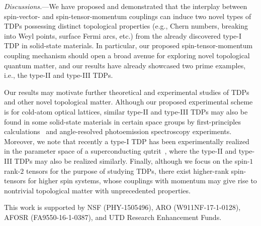 \documentclass[aps,prl,floatfix,twocolumn,reprint]{revtex4}
\begin{document}
{\color{blue}\textit{Discussions.}---}We have proposed and
demonstrated that the interplay between spin-vector- and
spin-tensor-momentum couplings can induce two novel types of TDPs possessing
distinct topological properties (e.g., Chern numbers, breaking into Weyl
points, surface Fermi arcs, etc.) from the already discovered type-I TDP in
solid-state materials. In particular, our proposed spin-tensor-momentum
coupling mechanism should open a broad avenue for exploring novel
topological quantum matter, and our results have already showcased two prime
examples, i.e., the type-II and type-III TDPs.

Our results may motivate further theoretical and experimental studies of
TDPs and other novel topological matter. Although our proposed experimental
scheme is for cold-atom optical lattices, similar type-II and type-III TDPs may
also be found in some solid-state materials in certain space groups
by first-principles calculations~\cite{Weng} and
angle-resolved photoemission spectroscopy experiments. 
Moreover, we note that recently
a type-I TDP has been experimentally realized in the parameter space 
of a superconducting qutrit~\cite{SQ}, 
where the type-II and type-III TDPs may also be realized similarly. Finally,
although we focus on the spin-$1$ rank-$2$ tensors for the purpose of
studying TDPs, there exist higher-rank spin-tensors for higher spin systems,
whose couplings with momentum may give rise to 
nontrivial topological matter with unprecedented properties.

\begin{acknowledgments}
This work is supported by NSF (PHY-1505496), ARO (W911NF-17-1-0128), AFOSR
(FA9550-16-1-0387), and UTD Research Enhancement Funds.
\end{acknowledgments}
\end{document}
